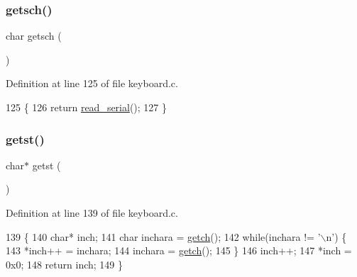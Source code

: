 \subsubsection{\texorpdfstring{getsch()}{getsch()}}
{\footnotesize\ttfamily char getsch (\begin{DoxyParamCaption}{ }\end{DoxyParamCaption})}



Definition at line 125 of file keyboard.\+c.


\begin{DoxyCode}
125               \{
126     \textcolor{keywordflow}{return} \hyperlink{a00056_ad343a7018f74662f794968dfa0523841_ad343a7018f74662f794968dfa0523841}{read\_serial}();
127 \}
\end{DoxyCode}
\mbox{\label{a00038_ab88a2e96bbe585e228a5b201435c0240_ab88a2e96bbe585e228a5b201435c0240}} 
\subsubsection{\texorpdfstring{getst()}{getst()}}
{\footnotesize\ttfamily char$\ast$ getst (\begin{DoxyParamCaption}{ }\end{DoxyParamCaption})}



Definition at line 139 of file keyboard.\+c.


\begin{DoxyCode}
139               \{
140     \textcolor{keywordtype}{char}* inch;
141     \textcolor{keywordtype}{char} inchara = \hyperlink{a00038_af3facad10e05defa48d45b46eb9ebe7e_af3facad10e05defa48d45b46eb9ebe7e}{getch}();
142     \textcolor{keywordflow}{while}(inchara != \textcolor{charliteral}{'\(\backslash\)n'}) \{
143         *inch++ = inchara;
144         inchara = \hyperlink{a00038_af3facad10e05defa48d45b46eb9ebe7e_af3facad10e05defa48d45b46eb9ebe7e}{getch}();
145     \}
146     inch++;
147     *inch = 0x0;
148     \textcolor{keywordflow}{return} inch;
149 \}
\end{DoxyCode}
\mbox{\label{a00038_aabdb223e5290f3b3c07bc82d075b87d7_aabdb223e5290f3b3c07bc82d075b87d7}} 
